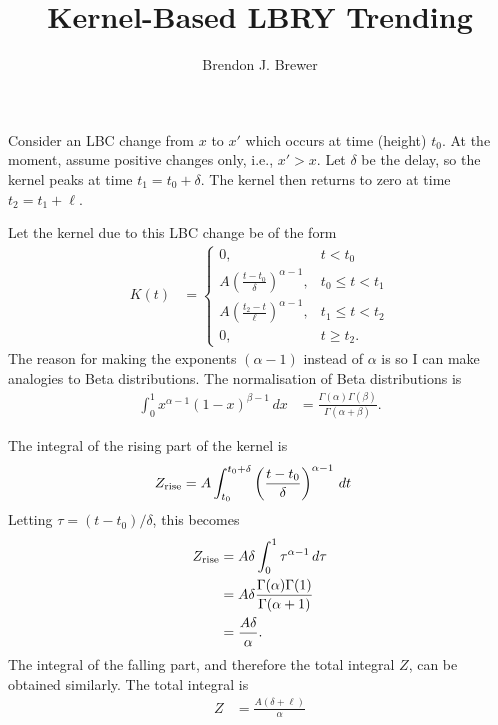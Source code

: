 \documentclass[a4paper, 12pt]{article}
\title{Kernel-Based LBRY Trending}
\author{Brendon J. Brewer}
\date{}
\begin{document}
\maketitle


\setlength{\parindent}{0pt}
\setlength{\parskip}{8pt}

Consider an LBC change from $x$ to $x'$ which occurs at time (height) $t_0$.
At the moment, assume positive changes only, i.e., $x' > x$.
Let $\delta$ be the delay, so the kernel peaks at time $t_1 = t_0 + \delta$.
The kernel then returns to zero at time $t_2 = t_1 + \ell$.

Let the kernel due to this LBC change be of the form
\begin{align}
K(t) &=
    \left\{
        \begin{array}{lr}
            0, & t < t_0 \\
            A\left(\frac{t - t_0}{\delta}\right)^{\alpha-1}, & t_0 \leq t < t_1 \\
            A\left(\frac{t_2 - t}{\ell}  \right)^{\alpha-1}, & t_1 \leq t < t_2 \\
            0, & t \geq t_2.
        \end{array}
    \right.
\end{align}
The reason for making the exponents $(\alpha-1)$ instead of $\alpha$ is
so I can make analogies to Beta distributions. The normalisation of Beta
distributions is
\begin{align}
\int_0^1 x^{\alpha-1}(1-x)^{\beta-1} \, dx
    &= \frac{\Gamma(\alpha)\Gamma(\beta)}{\Gamma(\alpha+\beta)}.
\end{align}

The integral of the rising part of the kernel is
\begin{align}
Z_{\rm rise} &= A\int_{t_0}^{t_0+\delta}
                    \left(\frac{t - t_0}{\delta}\right)^{\alpha-1} \, dt
\end{align}
Letting $\tau = (t-t_0)/\delta$, this becomes
\begin{align}
Z_{\rm rise} &= A\delta\int_0^1
                    \tau^{\alpha-1} \, d\tau \\
             &= A\delta
                    \frac{\Gamma(\alpha)\Gamma(1)}{\Gamma(\alpha+1)} \\
             &= \frac{A\delta}{\alpha}.
\end{align}
The integral of the falling part, and therefore the total integral $Z$,
can be obtained similarly. The total integral is
\begin{align}
Z &= \frac{A(\delta + \ell)}{\alpha}
\end{align}
\end{document}
